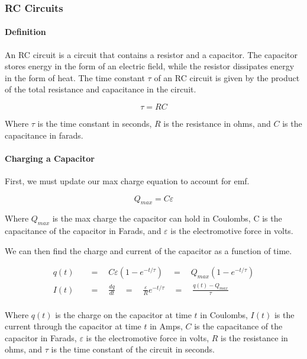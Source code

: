 \hrulefill

\subsubsection*{RC Circuits}

\paragraph*{Definition}
An RC circuit is a circuit that contains a resistor and a capacitor. The capacitor stores energy in the form of an electric field, 
while the resistor dissipates energy in the form of heat. The time constant $\tau$ of an RC circuit is given by the product of the 
total resistance and capacitance in the circuit.

\begin{equation*}
    \tau = RC
\end{equation*}

Where $\tau$ is the time constant in seconds, $R$ is the resistance in ohms, and $C$ is the capacitance in farads. 

\paragraph*{Charging a Capacitor}
First, we must update our max charge equation to account for emf.

\begin{equation*}
    Q_{max} = C\varepsilon
\end{equation*}

Where $Q_{max}$ is the max charge the capacitor can hold in Coulombs, C is the capacitance of the capacitor in Farads, and $\varepsilon$
is the electromotive force in volts.\\

\pagebreak

We can then find the charge and current of the capacitor as a function of time.

\begin{align*}
    q(t) \quad &= \quad C\varepsilon(1-e^{-t/\tau}) \quad = \quad Q_{max}(1-e^{-t/\tau})\\
    I(t) \quad &= \quad \frac{dq}{dt} \quad = \quad \frac{\varepsilon}{R}e^{-t/\tau} \quad = \quad \frac{q(t) - Q_{max}}{\tau}\\
\end{align*}

Where $q(t)$ is the charge on the capacitor at time $t$ in Coulombs, $I(t)$ is the current through the capacitor at time $t$ in Amps,
$C$ is the capacitance of the capacitor in Farads, $\varepsilon$ is the electromotive force in volts, $R$ is the resistance in ohms,
and $\tau$ is the time constant of the circuit in seconds.

